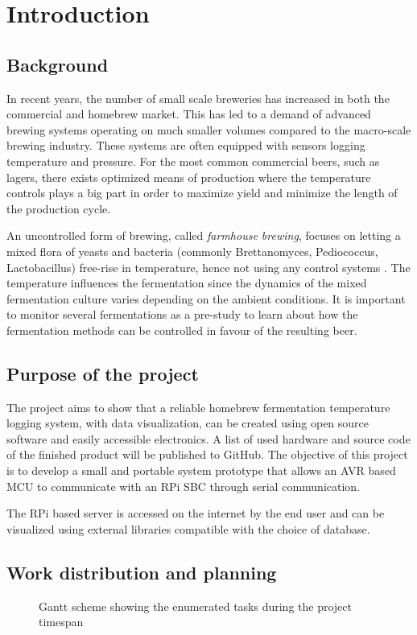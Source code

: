 \section{Introduction}%
\label{sec:introduction}

\subsection{Background}%
\label{sub:background}
In recent years, the number of small scale breweries has increased in both the commercial and homebrew market. This has led to a demand of advanced brewing systems operating on much smaller volumes compared to the macro-scale brewing industry. These systems are often equipped with sensors logging temperature and pressure. For the most common commercial beers, such as lagers, there exists optimized means of production where the temperature controls plays a big part in order to maximize yield and minimize the length of the production cycle.

An uncontrolled form of brewing, called \textit{farmhouse brewing}, focuses on letting a mixed flora of yeasts and bacteria (commonly Brettanomyces, Pediococcus, Lactobacillus) free-rise in temperature, hence not using any control systems \cite{MixedFermentation}. The temperature influences the fermentation since the dynamics of the mixed fermentation culture varies depending on the ambient conditions. It is important to monitor several fermentations as a pre-study to learn about how the fermentation methods can be controlled in favour of the resulting beer. 

\subsection{Purpose of the project}%
\label{sub:purpose_of_the_project}
The project aims to show that a reliable homebrew fermentation temperature logging system, with data visualization, can be created using open source software and easily accessible electronics. A list of used hardware and source code of the finished product will be published to GitHub. The objective of this project is to develop a small and portable system prototype that allows an AVR based MCU to communicate with an RPi SBC through serial communication.

The RPi based server is accessed on the internet by the end user and can be visualized using external libraries compatible with the choice of database.

\subsection{Work distribution and planning}%
\label{sub:work_distribution_and_planning}
\begin{figure}[h]
  \centering
  
  \caption{Gantt scheme showing the enumerated tasks during the project timespan}
  \label{fig:gantt}
\end{figure}

